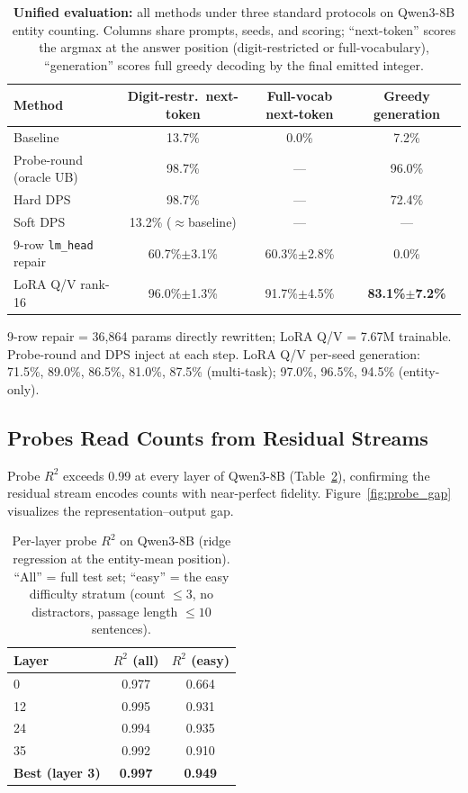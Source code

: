 \documentclass{article}
\begin{document}
\begin{table}[t]
\centering
\small
\caption{\textbf{Unified evaluation:} all methods under three standard protocols
  on Qwen3-8B entity counting. Columns share prompts, seeds, and scoring;
  ``next-token'' scores the argmax at the answer position (digit-restricted or
  full-vocabulary), ``generation'' scores full greedy decoding by the final
  emitted integer.}
\label{tab:unified_evaluation}
\begin{tabular}{lccc}
\toprule
\textbf{Method} & \textbf{Digit-restr.\ next-token} & \textbf{Full-vocab next-token} & \textbf{Greedy generation} \\
\midrule
Baseline & 13.7\% & 0.0\% & 7.2\% \\
Probe-round (oracle UB) &  98.7\% & --- & 96.0\% \\
Hard DPS & 98.7\% & --- & 72.4\% \\
Soft DPS & 13.2\% ($\approx$baseline) & --- & --- \\
9-row \texttt{lm\_head} repair & 60.7\%$\pm$3.1\% & 60.3\%$\pm$2.8\% & 0.0\% \\
LoRA Q/V rank-16 & 96.0\%$\pm$1.3\% & 91.7\%$\pm$4.5\% & \textbf{83.1\%$\pm$7.2\%} \\
\bottomrule
\end{tabular}
\vspace{3pt}
\par\scriptsize
9-row repair = 36,864 params directly rewritten; LoRA Q/V = 7.67M trainable.
Probe-round and DPS inject at each step. LoRA Q/V per-seed generation:
71.5\%, 89.0\%, 86.5\%, 81.0\%, 87.5\% (multi-task); 97.0\%, 96.5\%,
94.5\% (entity-only).
\end{table}

\subsection{Probes Read Counts from Residual Streams}

Probe $R^2$ exceeds 0.99 at every layer of Qwen3-8B (Table~\ref{tab:probe_r2}),
confirming the residual stream encodes counts with near-perfect fidelity.
Figure~\ref{fig:probe_gap} visualizes the representation--output gap.

\begin{table}[t]
\centering
\caption{Per-layer probe $R^2$ on Qwen3-8B (ridge regression at the entity-mean
  position). ``All'' = full test set; ``easy'' = the easy difficulty stratum
  (count $\leq 3$, no distractors, passage length $\leq 10$ sentences).}
\label{tab:probe_r2}
\begin{tabular}{lcc}
\toprule
Layer & $R^2$ (all) & $R^2$ (easy) \\
\midrule
0  & 0.977 & 0.664 \\
12 & 0.995 & 0.931 \\
24 & 0.994 & 0.935 \\
35 & 0.992 & 0.910 \\
\midrule
\textbf{Best (layer 3)} & \textbf{0.997} & \textbf{0.949} \\
\bottomrule
\end{tabular}
\end{table}
\end{document}

